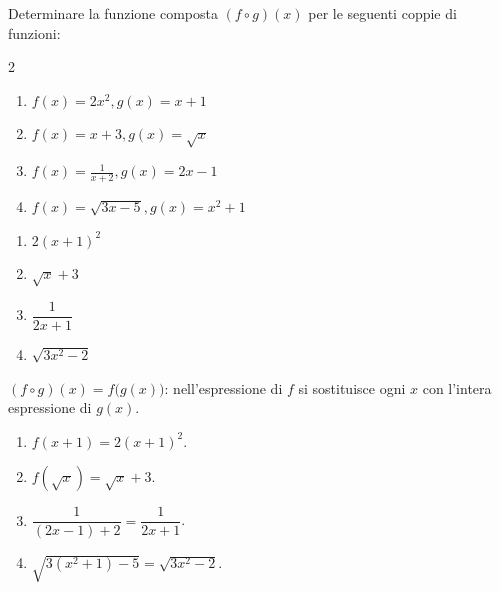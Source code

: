 \begin{question}[ID=5.4, subtitle={Funzione composta $(f\circ g)(x)$ — serie 4}, difficulty=media, tags={funzioni,composte}]
Determinare la funzione composta \( (f\circ g)(x) \) per le seguenti coppie di funzioni:

\begin{center}\begin{minipage}{0.92\linewidth}
\begin{multicols}{2}
\begin{enumerate}[leftmargin=3.2cm]
\item $f(x)=2x^2, g(x)=x+1$
\item $f(x)=x+3, g(x)=\sqrt{x}$
\item $f(x)=\frac{1}{x+2}, g(x)=2x-1$
\item $f(x)=\sqrt{3x-5}, g(x)=x^2+1$
\end{enumerate}
\end{multicols}
\end{minipage}\end{center}
\begin{solution}
\begin{enumerate}
    \item $2(x+1)^2$
    \item $\sqrt x+3$
    \item $\dfrac{1}{2x+1}$
    \item $\sqrt{3x^2-2}$
\end{enumerate}
\end{solution}
\begin{explanation}
$(f\circ g)(x)=f\big(g(x)\big)$: nell'espressione di $f$ si sostituisce ogni $x$ con l'intera espressione di $g(x)$.
\begin{enumerate}
    \item $f(x+1)=2(x+1)^2$.
    \item $f(\sqrt x)=\sqrt x+3$.
    \item $\dfrac{1}{(2x-1)+2}=\dfrac{1}{2x+1}$.
    \item $\sqrt{3(x^2+1)-5}=\sqrt{3x^2-2}$.
\end{enumerate}
\end{explanation}
\end{question}


